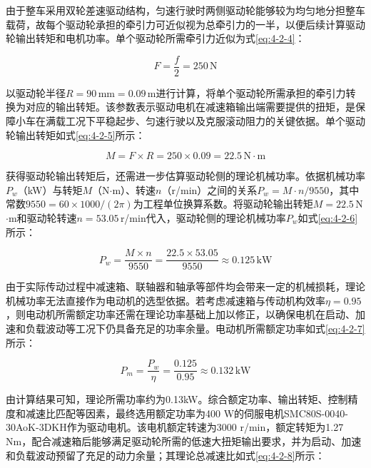 {{{        由于整车采用双轮差速驱动结构，匀速行驶时两侧驱动轮能够较为均匀地分担整车载荷，故每个驱动轮承担的牵引力可近似视为总牵引力的一半，以便后续计算驱动轮输出转矩和电机功率。单个驱动轮所需牵引力近似为式\eqref{eq:4-2-4}：

        \begin{equation}
        F = \frac{f}{2} = 250\,\mathrm{N}
        \label{eq:4-2-4}
        \end{equation}

        以驱动轮半径$R=90\,\mathrm{mm}=0.09\,\mathrm{m}$进行计算，将单个驱动轮所需承担的牵引力转换为对应的输出转矩。该参数表示驱动电机在减速箱输出端需要提供的扭矩，是保障小车在满载工况下平稳起步、匀速行驶以及克服滚动阻力的关键依据。单个驱动轮输出转矩如式\eqref{eq:4-2-5}所示：

        \begin{equation}
        M = F\times R = 250\times0.09 = 22.5\,\mathrm{N\cdot m}
        \label{eq:4-2-5}
        \end{equation}

        获得驱动轮输出转矩后，还需进一步估算驱动轮侧的理论机械功率。依据机械功率$P_w$（kW）与转矩$M$（N$\cdot$m）、转速$n$（r/min）之间的关系$P_w = M\cdot n / 9550$，其中常数$9550 = 60 \times 1000/(2\pi)$为工程单位换算系数。将驱动轮输出转矩$M = 22.5$\,N$\cdot$m和驱动轮转速$n = 53.05$\,r/min代入，驱动轮侧的理论机械功率$P_w$如式\eqref{eq:4-2-6}所示：

        \begin{equation}
        P_w = \frac{M\times n}{9550} = \frac{22.5\times53.05}{9550} \approx 0.125\,\mathrm{kW}
        \label{eq:4-2-6}
        \end{equation}

        由于实际传动过程中减速箱、联轴器和轴承等部件均会带来一定的机械损耗，理论机械功率无法直接作为电动机的选型依据。若考虑减速箱与传动机构效率$\eta=0.95$，则电动机所需额定功率还需在理论功率基础上加以修正，以确保电机在启动、加速和负载波动等工况下仍具备充足的功率余量。电动机所需额定功率如式\eqref{eq:4-2-7}所示：

        \begin{equation}
        P_m = \frac{P_w}{\eta} = \frac{0.125}{0.95} \approx 0.132\,\mathrm{kW}
        \label{eq:4-2-7}
        \end{equation}

        由计算结果可知，理论所需功率约为0.13kW。综合额定功率、输出转矩、控制精度和减速比匹配等因素，最终选用额定功率为400 W的伺服电机SMC80S-0040-30AoK-3DKH作为驱动电机。该电机额定转速为3000 r/min，额定转矩为1.27 N\cdot m，配合减速箱后能够满足驱动轮所需的低速大扭矩输出要求，并为启动、加速和负载波动预留了充足的动力余量；其理论总减速比如式\eqref{eq:4-2-8}所示：

}}}
